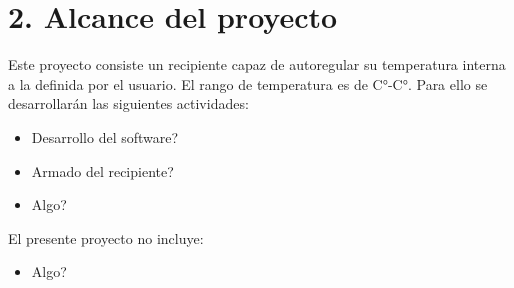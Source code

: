 \section{2. Alcance del proyecto}
\label{sec:alcance}

\quad Este proyecto consiste un recipiente capaz de autoregular su temperatura interna a la definida por el usuario. El rango de temperatura es de C°-C°.
Para ello se desarrollarán las siguientes actividades:
\begin{itemize}
  \item Desarrollo del software?
  \item Armado del recipiente?
  \item Algo?
\end{itemize}
El presente proyecto no incluye:
\begin{itemize}
  \item Algo?
\end{itemize}